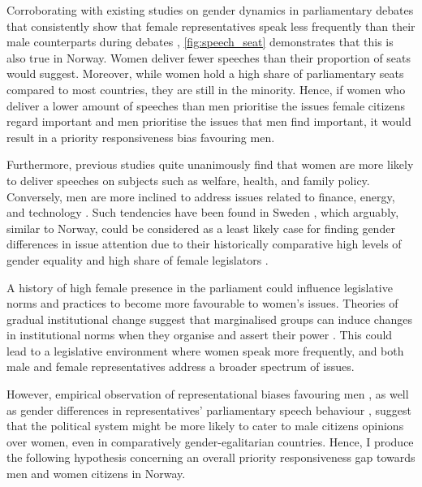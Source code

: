 Corroborating with existing studies on gender dynamics in parliamentary debates that consistently show that female representatives speak less frequently than their male counterparts during debates \parencite{back_when_2019, back_who_2014, soyland_norway_2021}, \cref{fig:speech_seat} demonstrates that this is also true in Norway. Women deliver fewer speeches than their proportion of seats would suggest. Moreover, while women hold a high share of parliamentary seats compared to most countries, they are still in the minority. Hence, if women who deliver a lower amount of speeches than men prioritise the issues female citizens regard important and men prioritise the issues that men find important, it would result in a priority responsiveness bias favouring men. 


Furthermore, previous studies quite unanimously find that women are more likely to deliver speeches on subjects such as welfare, health, and family policy. Conversely, men are more inclined to address issues related to finance, energy, and technology \parencite{back_when_2019, unal_role_2021, catalano_women_2009,hargrave_earning_nodate}. Such tendencies have been found in Sweden \parencite{back_politics_2021}, which arguably, similar to Norway, could be considered as a least likely case for finding gender differences in issue attention due to their historically comparative high levels of gender equality \parencite{undp_gender_2024} and high share of female legislators \parencite{ipu_inter_2024}. 


A history of high female presence in the parliament could influence legislative norms and practices to become more favourable to women's issues. Theories of gradual institutional change suggest that marginalised groups can induce changes in institutional norms when they organise and assert their power \parencite{mahoney_theory_2009, dahlerup_small_1988}. This could lead to a legislative environment where women speak more frequently, and both male and female representatives address a broader spectrum of issues.

However, empirical observation of representational biases favouring men \parencite[e.g][]{mathisen_influence_2024, persson_mans_2023, reher_gender_2018}, as well as gender differences in representatives' parliamentary speech behaviour \parencite[e.g.,][]{back_politics_2021, unal_role_2021}, suggest that the political system might be more likely to cater to male citizens opinions over women, even in comparatively gender-egalitarian countries. Hence, I produce the following hypothesis concerning an overall priority responsiveness gap towards men and women citizens in Norway. 

